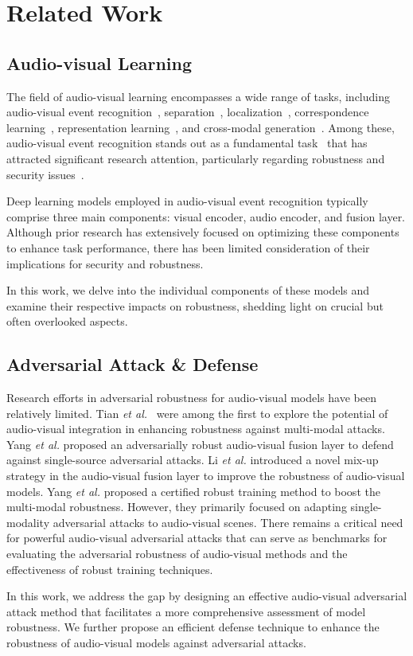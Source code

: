 \section{Related Work}
\subsection{Audio-visual Learning}
The field of audio-visual learning encompasses a wide range of tasks, including audio-visual event recognition~\citep{brousmiche2019audio,xia2022cross,brousmiche2022multimodal}, separation~\citep{wu2019time, majumder2021move2hear,majumder2022active,huang2023davis}, localization~\citep{wu2019dual, wu2021binaural,huang2023egocentric}, correspondence learning~\citep{min2020multimodal,zhu2021learning,morgado2021robust}, representation learning~\citep{zhou2019talking,cheng2020look,rahman2021tribert}, and cross-modal generation~\citep{chen2017deep,hao2018cmcgan, sung2023sound,liang2023av,liang2024language,huang2024scaling,liang2023neural}. Among these, audio-visual event recognition stands out as a fundamental task~\citep{gao2024audio} that has attracted significant research attention, particularly regarding robustness and security issues~\citep{yang2023quantifying}.

Deep learning models employed in audio-visual event recognition typically comprise three main components: visual encoder, audio encoder, and fusion layer. Although prior research has extensively focused on optimizing these components to enhance task performance, there has been limited consideration of their implications for security and robustness. 

In this work, we delve into the individual components of these models and examine their respective impacts on robustness, shedding light on crucial but often overlooked aspects.





\subsection{Adversarial Attack \& Defense}




Research efforts in adversarial robustness for audio-visual models have been relatively limited. Tian \textit{et al.}~\citep{DBLP:conf/cvpr/TianX21} were among the first to explore the potential of audio-visual integration in enhancing robustness against multi-modal attacks. Yang \textit{et al.}\citep{DBLP:conf/cvpr/YangLBCK21} proposed an adversarially robust audio-visual fusion layer to defend against single-source adversarial attacks. Li \textit{et al.} \citep{DBLP:conf/icassp/LiQLHM22} introduced a novel mix-up strategy in the audio-visual fusion layer to improve the robustness of audio-visual models. Yang \textit{et al.} \citep{yang2023quantifying} proposed a certified robust training method to boost the multi-modal robustness. 
However, they primarily focused on adapting single-modality adversarial attacks to audio-visual scenes. There remains a critical need for powerful audio-visual adversarial attacks that can serve as benchmarks for evaluating the adversarial robustness of audio-visual methods and the effectiveness of robust training techniques.

In this work, we address the gap by designing an effective audio-visual adversarial attack method that facilitates a more comprehensive assessment of model robustness. We further propose an efficient defense technique to enhance the robustness of audio-visual models against adversarial attacks.